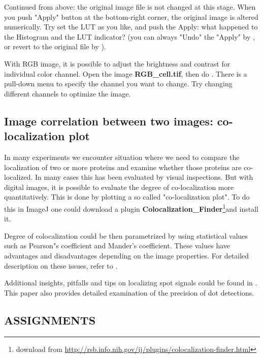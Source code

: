 \begin{indentexercise}{2}
Continued from above: the original image file
is not changed at this stage. When you push
"Apply" button at the bottom-right
corner, the original image is altered numerically. Try set the LUT as
you like, and push the Apply: what happened to the Histogram and the
LUT indicator? (you can always
"Undo" the "Apply" by , 
or revert to the original file by ).
\end{indentexercise}

\begin{indentexercise}{3}
With RGB image, it is possible to adjust the
brightness and contrast for individual color channel. Open the image
\textbf{RGB\_cell.tif}, then do . 
There is a pull-down menu to specify
the channel you want to change. Try changing different channels to
optimize the image. 
\end{indentexercise}

\subsection{Image correlation between two images: co-localization plot}

In many experiments we encounter situation where we need to compare the
localization of two or more proteins and examine whether those proteins
are co-localized. In many cases this has been evaluated by visual
inspections. But with digital images, it is possible to evaluate the
degree of co-localization more quantitatively. This is done by plotting
a so called "co-localization
plot". To do this in ImageJ one could download a
plugin \textbf{Colocalization\_Finder}\footnote{download from \url{http://rsb.info.nih.gov/ij/plugins/colocalization-finder.html}}and install it.

Degree of colocalization could be then parametrized by using statistical
values such as Pearson"s coefficient and
Mander's coefficient. These values have advantages and
disadvantages depending on the image properties. For detailed
description on these issues, refer to \citet*{BolteJM2006}.

Additional insights, pitfalls and tips on localizing spot signals could
be found in \citet{Waters2009}. This paper also provides detailed examination of the precision of dot detections. 
\clearpage

\subsection{ASSIGNMENTS}

